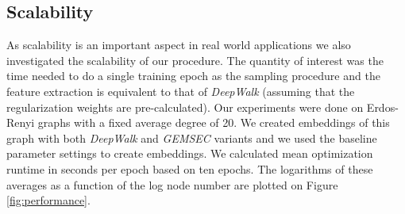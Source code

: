 \subsection{Scalability}
As scalability is an important aspect in real world applications we also investigated the scalability of our procedure. The quantity of interest was the time needed to do a single training epoch as the sampling procedure and the feature extraction is equivalent to that of \textit{DeepWalk} (assuming that the regularization weights are pre-calculated). Our experiments were done on Erdos-Renyi graphs with a fixed average degree of 20. We created embeddings of this graph with both \textit{DeepWalk} and \textit{GEMSEC} variants and we used the baseline parameter settings to create embeddings. We calculated mean optimization runtime in seconds per epoch based on ten epochs. The logarithms of these averages as a function of the log node number are plotted on Figure \ref{fig:performance}.
